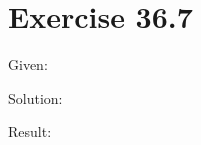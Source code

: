 \documentclass[a4paper, 10pt]{scrartcl}
\begin{document}
\section{Exercise 36.7}

Given:

Solution:

Result:
\end{document}
